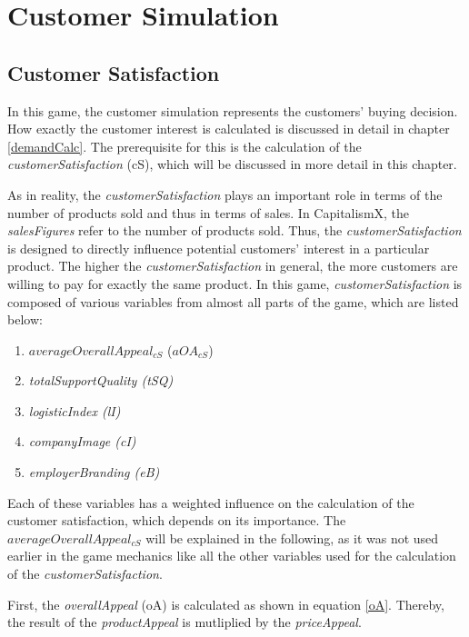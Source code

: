 \section{Customer Simulation} 
\label{sec:customsim}

\subsection{Customer Satisfaction}
\label{customerSatisfaction}
In this game, the customer simulation represents the customers' buying decision. How exactly the customer interest is calculated is discussed in detail in chapter \ref{demandCalc}. The prerequisite for this is the calculation of the \textit{customerSatisfaction} (\gls{cS}), which will be discussed in more detail in this chapter.

As in reality, the \textit{customerSatisfaction} plays an important role in terms of the number of products sold and thus in terms of sales. \cite{deptolla_effects_2004} In CapitalismX, the \textit{salesFigures} refer to the number of products sold.
Thus, the \textit{customerSatisfaction} is designed to directly influence potential customers' interest in a particular product. The higher the \textit{customerSatisfaction} in general, the more customers are willing to pay for exactly the same product. 
In this game, \textit{customerSatisfaction} is composed of various variables from almost all parts of the game, which are listed below:
\begin{enumerate}
      \item $averageOverallAppeal_{cS} $ ($aOA_{cS}$)
      \item \textit{totalSupportQuality (tSQ)}
      \item \textit{logisticIndex (lI)}
      \item \textit{companyImage (cI)}
      \item \textit{employerBranding (eB)}
\end{enumerate}
Each of these variables has a weighted influence on the calculation of the customer satisfaction, which depends on its importance.
The $averageOverallAppeal_{cS} $ will be explained in the following, as it was not used earlier in the game mechanics like all the other variables used for the calculation of the \textit{customerSatisfaction}.

First, the \textit{overallAppeal} (\gls{oA}) is calculated as shown in equation \ref{oA}. Thereby, the result of the \textit{productAppeal} is mutliplied by the \textit{priceAppeal}. 

